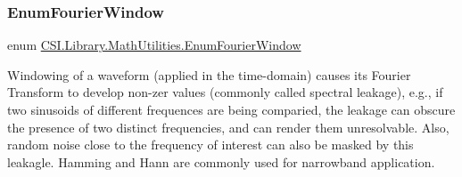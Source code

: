 \subsubsection{\texorpdfstring{EnumFourierWindow}{EnumFourierWindow}}
{\footnotesize\ttfamily enum \mbox{\hyperlink{namespace_c_s_i_1_1_library_1_1_math_utilities_ae198dd0fb970192351d3966c18b65f06}{C\+S\+I.\+Library.\+Math\+Utilities.\+Enum\+Fourier\+Window}}\hspace{0.3cm}{\ttfamily [strong]}}



Windowing of a waveform (applied in the time-\/domain) causes its Fourier Transform to develop non-\/zer values (commonly called spectral leakage), e.\+g., if two sinusoids of different frequences are being comparied, the leakage can obscure the presence of two distinct frequencies, and can render them unresolvable. Also, random noise close to the frequency of interest can also be masked by this leakagle. Hamming and Hann are commonly used for narrowband application. 

